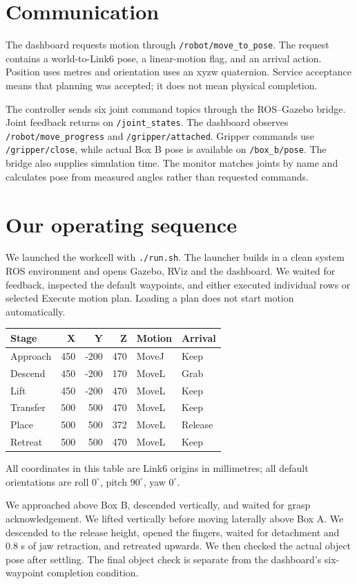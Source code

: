 \documentclass[11pt,a4paper]{report}
\begin{document}
\section{Communication}
The dashboard requests motion through \texttt{/robot/move\_to\_pose}. The request contains a world-to-Link6 pose, a linear-motion flag, and an arrival action. Position uses metres and orientation uses an xyzw quaternion. Service acceptance means that planning was accepted; it does not mean physical completion.

The controller sends six joint command topics through the ROS--Gazebo bridge. Joint feedback returns on \texttt{/joint\_states}. The dashboard observes \texttt{/robot/move\_progress} and \texttt{/gripper/attached}. Gripper commands use \texttt{/gripper/close}, while actual Box B pose is available on \texttt{/box\_b/pose}. The bridge also supplies simulation time. The monitor matches joints by name and calculates pose from measured angles rather than requested commands.
\section{Our operating sequence}
We launched the workcell with \texttt{./run.sh}. The launcher builds in a clean system ROS environment and opens Gazebo, RViz and the dashboard. We waited for feedback, inspected the default waypoints, and either executed individual rows or selected Execute motion plan. Loading a plan does not start motion automatically.
\begin{center}\begin{tabular}{lrrrll}\toprule
Stage & X & Y & Z & Motion & Arrival\\\midrule
Approach&450&-200&470&MoveJ&Keep\\
Descend&450&-200&170&MoveL&Grab\\
Lift&450&-200&470&MoveL&Keep\\
Transfer&500&500&470&MoveL&Keep\\
Place&500&500&372&MoveL&Release\\
Retreat&500&500&470&MoveL&Keep\\\bottomrule
\end{tabular}\end{center}
All coordinates in this table are Link6 origins in millimetres; all default orientations are roll $0^\circ$, pitch $90^\circ$, yaw $0^\circ$.

We approached above Box B, descended vertically, and waited for grasp acknowledgement. We lifted vertically before moving laterally above Box A. We descended to the release height, opened the fingers, waited for detachment and 0.8 s of jaw retraction, and retreated upwards. We then checked the actual object pose after settling. The final object check is separate from the dashboard's six-waypoint completion condition.
\end{document}

